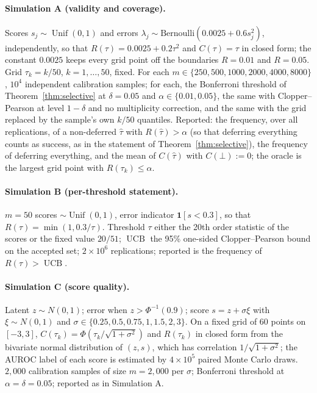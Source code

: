 \documentclass[11pt,letterpaper]{article}
\newcommand{\ind}[1]{\mathbf{1}[#1]}
\DeclareMathOperator{\UCB}{UCB}
\DeclareMathOperator{\Unif}{Unif}
\newcommand{\tauhat}{\hat{\tau}}
\theoremstyle{plain}
\theoremstyle{definition}
\theoremstyle{remark}
\begin{document}
\paragraph{Simulation A (validity and coverage).} Scores $s_j\sim\Unif(0,1)$ and errors $\lambda_j\sim\mathrm{Bernoulli}(0.0025+0.6s_j^{2})$, independently, so that $R(\tau)=0.0025+0.2\tau^{2}$ and $C(\tau)=\tau$ in closed form; the constant $0.0025$ keeps every grid point off the boundaries $R=0.01$ and $R=0.05$. Grid $\tau_k=k/50$, $k=1,\dots,50$, fixed. For each $m\in\{250,500,1000,2000,4000,8000\}$, $10^{4}$ independent calibration samples; for each, the Bonferroni threshold of Theorem~\ref{thm:selective} at $\delta=0.05$ and $\alpha\in\{0.01,0.05\}$, the same with Clopper--Pearson at level $1-\delta$ and no multiplicity correction, and the same with the grid replaced by the sample's own $k/50$ quantiles. Reported: the frequency, over all replications, of a non-deferred $\tauhat$ with $R(\tauhat)>\alpha$ (so that deferring everything counts as success, as in the statement of Theorem~\ref{thm:selective}), the frequency of deferring everything, and the mean of $C(\tauhat)$ with $C(\bot):=0$; the oracle is the largest grid point with $R(\tau_k)\le\alpha$.

\paragraph{Simulation B (per-threshold statement).} $m=50$ scores $\sim\Unif(0,1)$, error indicator $\ind{s<0.3}$, so that $R(\tau)=\min(1,0.3/\tau)$. Threshold $\tau$ either the 20th order statistic of the scores or the fixed value $20/51$; $\UCB$ the 95\% one-sided Clopper--Pearson bound on the accepted set; $2\times10^{6}$ replications; reported is the frequency of $R(\tau)>\UCB$.

\paragraph{Simulation C (score quality).} Latent $z\sim N(0,1)$; error when $z>\Phi^{-1}(0.9)$; score $s=z+\sigma\xi$ with $\xi\sim N(0,1)$ and $\sigma\in\{0.25,0.5,0.75,1,1.5,2,3\}$. On a fixed grid of 60 points on $[-3,3]$, $C(\tau_k)=\Phi(\tau_k/\sqrt{1+\sigma^{2}})$ and $R(\tau_k)$ in closed form from the bivariate normal distribution of $(z,s)$, which has correlation $1/\sqrt{1+\sigma^{2}}$; the AUROC label of each score is estimated by $4\times10^{5}$ paired Monte Carlo draws. $2{,}000$ calibration samples of size $m=2{,}000$ per $\sigma$; Bonferroni threshold at $\alpha=\delta=0.05$; reported as in Simulation A.
\end{document}
